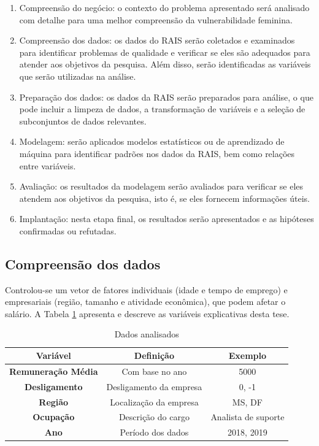 \begin{enumerate}
	\item Compreensão do negócio: o contexto do problema apresentado será analisado com detalhe para uma melhor compreensão da vulnerabilidade feminina.
	\item Compreensão dos dados: os dados do RAIS serão coletados e examinados para identificar problemas de qualidade e verificar se eles são adequados para atender aos objetivos da pesquisa. Além disso, serão identificadas as variáveis que serão utilizadas na análise.
	\item Preparação dos dados: os dados da RAIS serão preparados para análise, o que pode incluir a limpeza de dados, a transformação de variáveis e a seleção de subconjuntos de dados relevantes. 
	\item Modelagem: serão aplicados modelos estatísticos ou de aprendizado de máquina para identificar padrões nos dados da RAIS, bem como relações entre variáveis.
	\item Avaliação: os resultados da modelagem serão avaliados para verificar se eles atendem aos objetivos da pesquisa, isto é, se eles fornecem informações úteis.
	\item Implantação: nesta etapa final, os resultados serão apresentados e as hipóteses confirmadas ou refutadas.     	      	      	      	      	      
\end{enumerate}


\subsection{Compreensão dos dados}

Controlou-se um vetor de fatores individuais (idade e tempo de emprego) e empresariais
(região, tamanho e atividade econômica), que podem afetar o salário. A Tabela \ref{vars} apresenta e
descreve as variáveis explicativas desta tese.

\begin{table}[htbp]
	\caption{Dados analisados}
	\begin{center}
		\begin{tabular}{|c|c|c|}
			\hline
			\textbf{Variável}            & \textbf{Definição}     & \textbf{Exemplo}    \\ 
			\hline 
			\textbf{Remuneração Média} & Com base no ano          & 5000                \\
			\hline
			\textbf{Desligamento}         & Desligamento da empresa  & 0, -1               \\
			\hline 
			\textbf{Região}              & Localização da empresa & MS, DF              \\
			\hline 
			\textbf{Ocupação}           & Descrição do cargo     & Analista de suporte \\
			\hline 
			\textbf{Ano}                  & Período dos dados       & 2018, 2019          \\
			\hline
		\end{tabular}
		\label{vars}
	\end{center}
\end{table}


